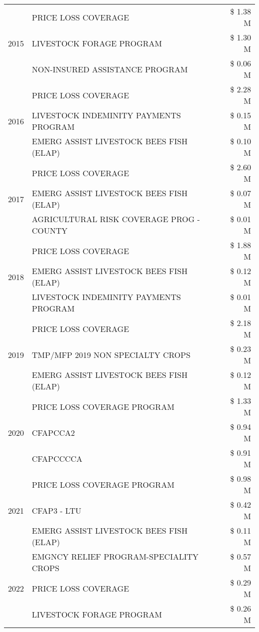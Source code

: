 \begin{tabular}{llr}
\cline{1-3}
\multirow[t]{3}{*}{2015} & PRICE LOSS COVERAGE & \$ 1.38 M \\
 & LIVESTOCK FORAGE PROGRAM & \$ 1.30 M \\
 & NON-INSURED ASSISTANCE PROGRAM & \$ 0.06 M \\
\cline{1-3}
\multirow[t]{3}{*}{2016} & PRICE LOSS COVERAGE & \$ 2.28 M \\
 & LIVESTOCK INDEMINITY PAYMENTS PROGRAM & \$ 0.15 M \\
 & EMERG ASSIST LIVESTOCK BEES FISH (ELAP) & \$ 0.10 M \\
\cline{1-3}
\multirow[t]{3}{*}{2017} & PRICE LOSS COVERAGE & \$ 2.60 M \\
 & EMERG ASSIST LIVESTOCK BEES FISH (ELAP) & \$ 0.07 M \\
 & AGRICULTURAL RISK COVERAGE PROG - COUNTY & \$ 0.01 M \\
\cline{1-3}
\multirow[t]{3}{*}{2018} & PRICE LOSS COVERAGE & \$ 1.88 M \\
 & EMERG ASSIST LIVESTOCK BEES FISH (ELAP) & \$ 0.12 M \\
 & LIVESTOCK INDEMINITY PAYMENTS PROGRAM & \$ 0.01 M \\
\cline{1-3}
\multirow[t]{3}{*}{2019} & PRICE LOSS COVERAGE & \$ 2.18 M \\
 & TMP/MFP 2019 NON SPECIALTY CROPS & \$ 0.23 M \\
 & EMERG ASSIST LIVESTOCK BEES FISH (ELAP) & \$ 0.12 M \\
\cline{1-3}
\multirow[t]{3}{*}{2020} & PRICE LOSS COVERAGE PROGRAM & \$ 1.33 M \\
 & CFAPCCA2 & \$ 0.94 M \\
 & CFAPCCCCA & \$ 0.91 M \\
\cline{1-3}
\multirow[t]{3}{*}{2021} & PRICE LOSS COVERAGE PROGRAM & \$ 0.98 M \\
 & CFAP3 - LTU & \$ 0.42 M \\
 & EMERG ASSIST LIVESTOCK BEES FISH (ELAP) & \$ 0.11 M \\
\cline{1-3}
\multirow[t]{3}{*}{2022} & EMGNCY RELIEF PROGRAM-SPECIALITY CROPS & \$ 0.57 M \\
 & PRICE LOSS COVERAGE & \$ 0.29 M \\
 & LIVESTOCK FORAGE PROGRAM & \$ 0.26 M \\
\cline{1-3}
\bottomrule
\end{tabular}
